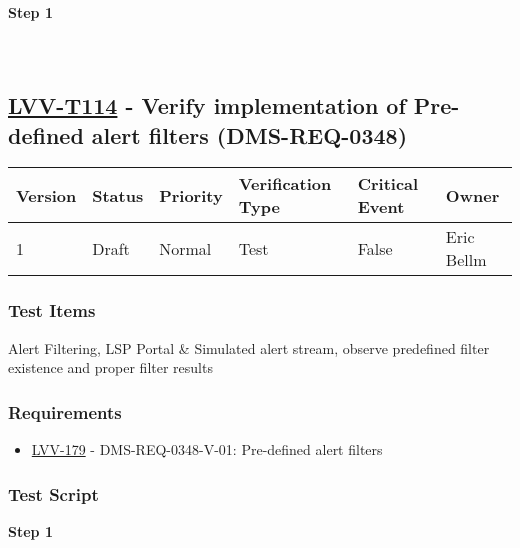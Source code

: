 \textbf{Step 1}\\
~\\
~\\

\hypertarget{lvv-t114---verify-implementation-of-pre-defined-alert-filters-dms-req-0348}{%
\subsection{\texorpdfstring{\href{https://jira.lsstcorp.org/secure/Tests.jspa\#/testCase/LVV-T114}{LVV-T114}
- Verify implementation of Pre-defined alert filters
(DMS-REQ-0348)}{LVV-T114 - Verify implementation of Pre-defined alert filters (DMS-REQ-0348)}}\label{lvv-t114---verify-implementation-of-pre-defined-alert-filters-dms-req-0348}}

\begin{longtable}[]{@{}llllll@{}}
\toprule
Version & Status & Priority & Verification Type & Critical Event &
Owner\tabularnewline
\midrule
\endhead
1 & Draft & Normal & Test & False & Eric Bellm\tabularnewline
\bottomrule
\end{longtable}

\hypertarget{test-items-90}{%
\subsubsection{Test Items}\label{test-items-90}}

Alert Filtering, LSP Portal \& Simulated alert stream, observe
predefined filter existence and proper filter results

\hypertarget{requirements-91}{%
\subsubsection{Requirements}\label{requirements-91}}

\begin{itemize}
\tightlist
\item
  \href{https://jira.lsstcorp.org/browse/LVV-179}{LVV-179} -
  DMS-REQ-0348-V-01: Pre-defined alert filters
\end{itemize}

\hypertarget{test-script-91}{%
\subsubsection{Test Script}\label{test-script-91}}

\textbf{Step 1}\\
~\\
~\\

